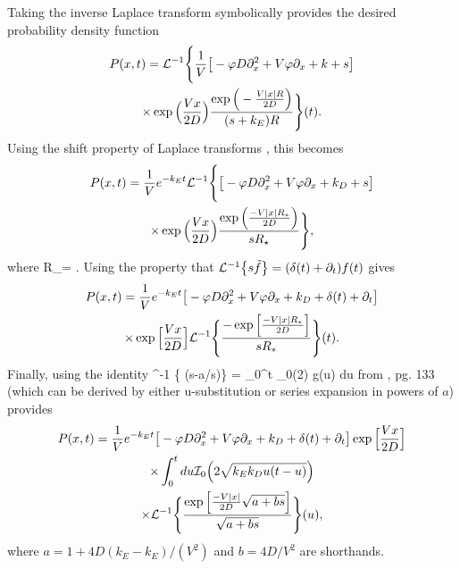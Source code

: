 Taking the inverse Laplace transform symbolically provides the desired probability density function
\DIFaddbegin \begin{multline} P(x,t) = \mathcal{L}^{-1}\Bigg\{ \frac{1}{V} \big[-\varphi D\partial_x^2 + V\varphi \partial_x + k + s \big] \\ \times \exp\Big(\frac{Vx}{2D}\Big) \frac{\exp\Big(-\frac{V|x|R}{2D} \Big)}{(s+k_E)R} \Bigg\}(t). \end{multline}
\DIFaddend Using the shift property of Laplace transforms \citep[e.g.][]{Arfken1985}, this becomes
 \DIFaddbegin \begin{multline} P(x,t) = \frac{1}{V}e^{-k_E t} \mathcal{L}^{-1}\Bigg\{ \big[-\varphi D\partial_x^2 + V \varphi \partial_x + k_D + s\big] \\ \times \exp\Big(\frac{Vx}{2D}\Big) \frac{\exp\Big(\frac{-V|x|R_\ast}{2D}\Big)}{s R_\star} \Bigg\},\end{multline}
\DIFaddend where 
\be R_\ast = . \ee
Using the property that $\mathcal{L}^{-1}\big\{s \tilde{f}\big\} = (\delta(t) + \partial_t)f(t)$ \citep{Arfken1985} gives
\DIFaddbegin \begin{multline}
 P(x,t) = \frac{1}{V} e^{-k_E t} \big[ -\varphi D\partial_x^2 + V\varphi \partial_x + k_D + \delta(t) + \partial_t \big] \\ \times \exp\Big[\frac{Vx}{2D}\Big] \mathcal{L}^{-1}\Bigg\{ \frac{-\exp\Big[\frac{-V|x|R_\ast}{2D}\Big]}{sR_\ast} \Bigg\}(t).
\end{multline}
\DIFaddend Finally, using the identity
\be {}^{-1} \Big\{  (s-a/s)\Big\} = \int_0^t _0\Big(2\Big) g(u) du
\ee
from \citet{Bateman1953}, pg. 133 (which can be derived by either u-substitution or series expansion in powers of $a$) provides
\DIFdelbegin \DIFdel{:
}%
\DIFdelend \DIFaddbegin \begin{multline}  P(x,t) = \frac{1}{V} e^{-k_E t}  \big[ -\varphi D\partial_x^2 + V\varphi \partial_x + k_D + \delta(t) + \partial_t \big] \exp\Big[\frac{Vx}{2D}\Big]\\ \times \int_0^t du \mathcal{I}_0\Big( 2 \sqrt{k_Ek_D u(t-u)}\Big) \\ \times \mathcal{L}^{-1}\Bigg\{ \frac{\exp\Big[ \frac{-V|x|}{2D}\sqrt{a+b s}\Big]}{\sqrt{a + b s}}\Bigg\}(u) , \label{eq:magic}\end{multline}\DIFaddend 
where $a = 1 + 4D(k_E-k_E)/(V^2)$ and $b = 4D/V^2$ are shorthands.

